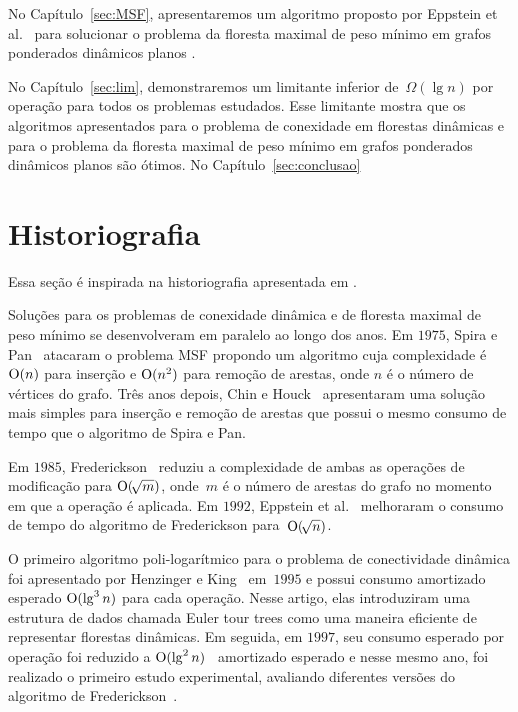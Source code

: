No Capítulo~\ref{sec:MSF}, apresentaremos um algoritmo proposto por Eppstein et al.~\cite{EPPSTEIN-planar} para solucionar o problema da floresta maximal de peso mínimo em grafos ponderados dinâmicos planos . 

No Capítulo~\ref{sec:lim}, demonstraremos um limitante inferior de~$\Omega(\lg n)$ por operação para todos os problemas estudados. Esse limitante mostra que os algoritmos apresentados para o problema de conexidade em florestas dinâmicas e para o problema da floresta maximal de peso mínimo em grafos ponderados dinâmicos planos são ótimos.
No Capítulo~\ref{sec:conclusao} 

\newpage
\section{Historiografia}

Essa seção é inspirada na historiografia apresentada em \cite{HHSRecentAdvances2022, Zaroliagis2002}.

Soluções para os problemas de conexidade dinâmica e de floresta maximal de peso mínimo se desenvolveram em paralelo ao longo dos anos. Em $1975$, Spira e Pan~\cite{SP1975} atacaram o problema MSF propondo um algoritmo cuja complexidade é $\mathrm{O}(n)$ para inserção e $\mathrm{O}(n^2)$ para remoção de arestas, onde $n$ é o número de vértices do grafo. Três anos depois, Chin e Houck~\cite{CH1978} apresentaram uma solução mais simples para inserção e remoção de arestas que possui o mesmo consumo de tempo que o algoritmo de Spira e Pan.

Em $1985$, Frederickson~\cite{frederickson1983data} reduziu a complexidade de ambas as operações de modificação para $\mathrm{O}(\!\sqrt{m})$, onde~$m$ é o número de arestas do grafo no momento em que a operação é aplicada.
Em $1992$, Eppstein et al.~\cite{Eppstein1992SparsificationaTF,Eppstein1997SparsificationaTF} melhoraram o consumo de tempo do algoritmo de Frederickson para~$\mathrm{O}(\!\sqrt{n})$.

O primeiro algoritmo poli-logarítmico para o problema de conectividade dinâmica foi apresentado por Henzinger e King~\cite{HenzingerKing} em~$1995$ e possui consumo amortizado esperado $\mathrm{O}(\lg^3 n)$ para cada operação. Nesse artigo, elas introduziram uma estrutura de dados chamada Euler tour trees como uma maneira eficiente de representar florestas dinâmicas.
Em seguida, em $1997$, seu consumo esperado por operação foi reduzido a $\mathrm{O}(\lg^2 n)$~\cite{HenzingerThorup} amortizado esperado e nesse mesmo ano, foi realizado o primeiro estudo experimental, avaliando diferentes versões do algoritmo de Frederickson~\cite{xpAnalyGiuseppe}.

